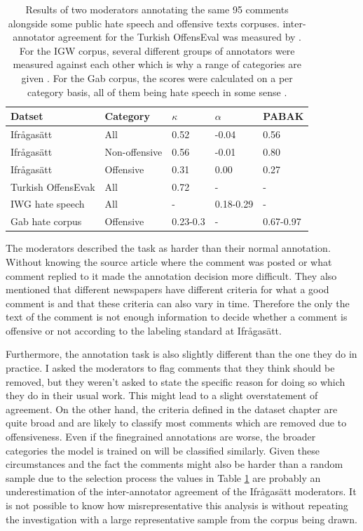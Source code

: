 \documentclass[nofilelist]{cslthse-msc}
\begin{document}
\begin{table}[t]
\centering
\begin{tabular}{@{}lllll@{}}
\toprule
Datset & Category  & $\kappa$ & $\alpha$ & PABAK \\ \midrule
Ifrågasätt & All  &  0.52 & -0.04 & 0.56 \\
Ifrågasätt & Non-offensive  & 0.56 & -0.01 & 0.80  \\
Ifrågasätt & Offensive  & 0.31 & 0.00 & 0.27  \\
Turkish OffensEvak & All  & 0.72 & - & - \\
IWG hate speech & All  & - & 0.18-0.29 & - \\
Gab hate corpus & Offensive & 0.23-0.3 & - & 0.67-0.97 \\
\bottomrule
\end{tabular}
\caption{Results of two moderators annotating the same 95 comments alongside some public hate speech and offensive texts corpuses. inter-annotator agreement for the Turkish OffensEval was measured by \citet{turkoffensive}. For the IGW corpus, several different groups of annotators were measured against each other which is why a range of categories are given \citep{DBLP:journals/corr/RossRCCKW17}. For the Gab corpus, the scores were calculated on a per category basis, all of them being hate speech in some sense \citep{kennedy_atari}.}
\label{tab:interannotatoragreement}
\end{table}


The moderators described the task as harder than their normal annotation. Without knowing the source article where the comment was posted or what comment replied to it made the annotation decision more difficult. They also mentioned that different newspapers have different criteria for what a good comment is and that these criteria  can also vary in time. Therefore the only the text of the comment is not enough information to decide whether a comment is offensive or not according to the labeling standard at Ifrågasätt. 

Furthermore, the annotation task is also slightly different than the one they do in practice. I asked the moderators to flag comments that they think should be removed, but they weren't asked to state the specific reason for doing so which they do in their usual work. This might lead to a slight overstatement of agreement. On the other hand, the criteria defined in the dataset chapter are quite broad and are likely to classify most comments which are removed due to offensiveness. Even if the finegrained annotations are worse, the broader categories the model is trained on will be classified similarly. Given these circumstances and the fact the comments might also be harder than a random sample due to the selection process the values in Table \ref{tab:interannotatoragreement} are probably an underestimation of the inter-annotator agreement of the Ifrågasätt moderators. It is not possible to know how misrepresentative this analysis is without repeating the investigation with a large representative sample from the corpus being drawn.
\end{document}
